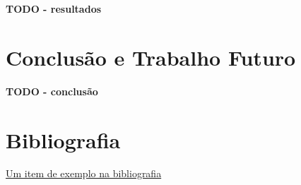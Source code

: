\documentclass[12pt, a4paper]{article}
\begin{document}
\textbf{\color{red} TODO - resultados}

\section{Conclusão e Trabalho Futuro}

\textbf{\color{red} TODO - conclusão}

\begingroup
\section{Bibliografia}
\renewcommand{\section}[2]{}

\begin{thebibliography}{9}
        \href{https://youtu.be/dQw4w9WgXcQ}{Um item de exemplo na bibliografia}
\end{thebibliography}
\endgroup
\end{document}
